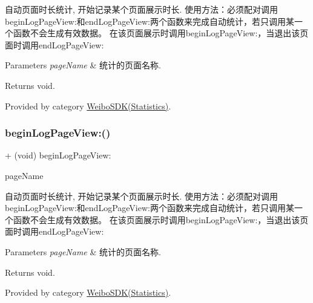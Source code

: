 自动页面时长统计, 开始记录某个页面展示时长. 使用方法：必须配对调用begin\+Log\+Page\+View\+:和end\+Log\+Page\+View\+:两个函数来完成自动统计，若只调用某一个函数不会生成有效数据。 在该页面展示时调用begin\+Log\+Page\+View\+:，当退出该页面时调用end\+Log\+Page\+View\+: 
\begin{DoxyParams}{Parameters}
{\em page\+Name} & 统计的页面名称. \\
\hline
\end{DoxyParams}
\begin{DoxyReturn}{Returns}
void. 
\end{DoxyReturn}


Provided by category \mbox{\hyperlink{category_weibo_s_d_k_07_statistics_08_ae9b18093f71e740c51f254fb517e818d}{Weibo\+S\+D\+K(\+Statistics)}}.

\mbox{\label{interface_weibo_s_d_k_ae9b18093f71e740c51f254fb517e818d}} 
\subsubsection{\texorpdfstring{begin\+Log\+Page\+View\+:()}{beginLogPageView:()}\hspace{0.1cm}{\footnotesize\ttfamily [2/3]}}
{\footnotesize\ttfamily + (void) begin\+Log\+Page\+View\+: \begin{DoxyParamCaption}\item[{(N\+S\+String $\ast$)}]{page\+Name }\end{DoxyParamCaption}}

自动页面时长统计, 开始记录某个页面展示时长. 使用方法：必须配对调用begin\+Log\+Page\+View\+:和end\+Log\+Page\+View\+:两个函数来完成自动统计，若只调用某一个函数不会生成有效数据。 在该页面展示时调用begin\+Log\+Page\+View\+:，当退出该页面时调用end\+Log\+Page\+View\+: 
\begin{DoxyParams}{Parameters}
{\em page\+Name} & 统计的页面名称. \\
\hline
\end{DoxyParams}
\begin{DoxyReturn}{Returns}
void. 
\end{DoxyReturn}


Provided by category \mbox{\hyperlink{category_weibo_s_d_k_07_statistics_08_ae9b18093f71e740c51f254fb517e818d}{Weibo\+S\+D\+K(\+Statistics)}}.

